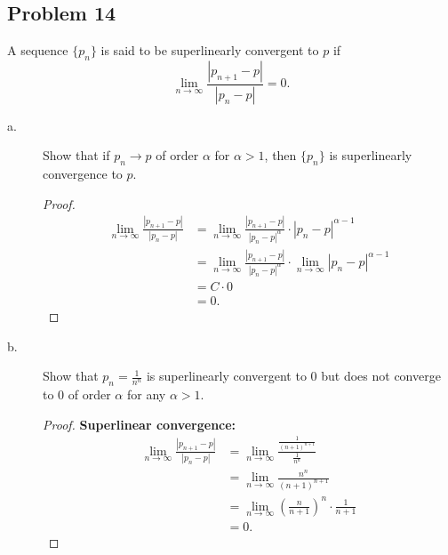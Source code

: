 \documentclass{article}
\begin{document}
\subsection*{Problem 14}
A sequence $\{p_n\}$ is said to be superlinearly convergent to $p$ if 
$$\lim_{n\to\infty}\frac{|p_{n+1}-p|}{|p_n-p|}=0.$$
\begin{description}
    \item[a.] Show that if $p_n\rightarrow p$ of order $\alpha$ for $\alpha>1$, then $\{p_n\}$ 
    is superlinearly convergence to $p$.
    \begin{proof}
        \begin{align*}
            \lim_{n\rightarrow\infty}\frac{|p_{n+1}-p|}{|p_n-p|} & = 
            \lim_{n\rightarrow\infty}\frac{|p_{n+1}-p|}{|p_n-p|^\alpha}\cdot|p_n-p|^{\alpha-1} \\
            & = \lim_{n\rightarrow\infty}\frac{|p_{n+1}-p|}{|p_n-p|^\alpha}\cdot
            \lim_{n\rightarrow\infty}|p_n-p|^{\alpha-1} \\
            & = C\cdot 0 \\
            & = 0.
        \end{align*}
        
    \end{proof}

    \item[b.] Show that $p_n=\frac{1}{n^n}$ is superlinearly convergent to 0 but does not 
    converge to 0 of order $\alpha$ for any $\alpha>1$.
    \begin{proof}
        \textbf{Superlinear convergence:}
        \begin{align*}
            \lim_{n\rightarrow\infty}\frac{|p_{n+1}-p|}{|p_n-p|} & = 
            \lim_{n\rightarrow\infty}\frac{\frac{1}{(n+1)^{n+1}}}{\frac{1}{n^n}} \\
            & = \lim_{n\rightarrow\infty}\frac{n^n}{(n+1)^{n+1}} \\
            & = \lim_{n\rightarrow\infty}\left(\frac{n}{n+1}\right)^n\cdot\frac{1}{n+1} \\
            & = 0.
        \end{align*}


\end{proof}
\end{description}
\end{document}
